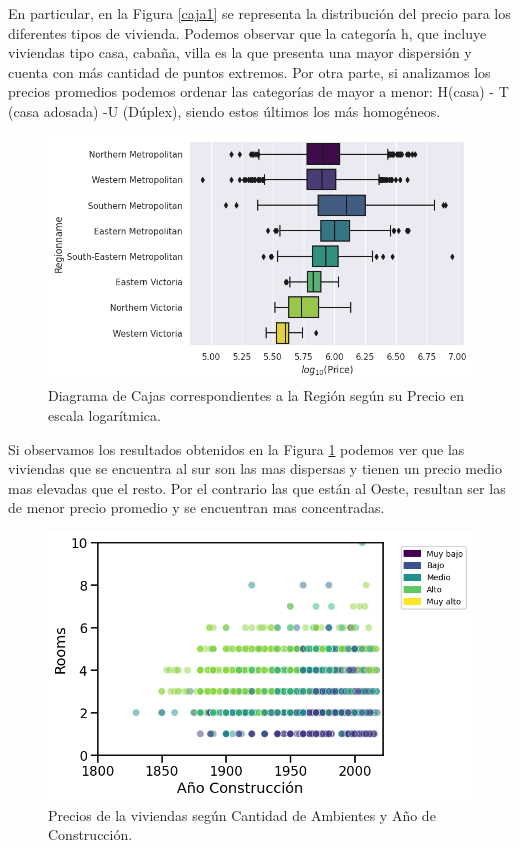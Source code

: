 En particular, en la Figura \ref{caja1} se representa la distribución del precio para los diferentes tipos de vivienda. Podemos observar que la categoría h, que incluye viviendas tipo casa, cabaña, villa es la que presenta una mayor dispersión y cuenta con más cantidad de puntos extremos. Por otra parte, si analizamos los precios promedios podemos ordenar las categorías de mayor a menor: H(casa) - T (casa adosada) -U (Dúplex), siendo estos últimos los más homogéneos.

\begin{figure} [!ht]
\begin{center}
\includegraphics[width=0.8\columnwidth]{img/box2.png}
\caption{Diagrama de Cajas correspondientes a la Región según su Precio en escala logarítmica.}
\label{caja2}
\end{center}
\end{figure}


Si observamos los resultados obtenidos en la Figura \ref{caja2} podemos ver que las viviendas que se encuentra al sur son las mas dispersas y tienen un precio medio mas elevadas que el resto. Por el contrario las que están al Oeste, resultan ser las de menor precio promedio y se encuentran mas concentradas.

\begin{figure} [!ht]
\begin{center}
\includegraphics[width=0.8\columnwidth]{img/Scatt1.png}
\caption{Precios de la viviendas según Cantidad de Ambientes y Año de Construcción.}
\label{amb-anio}
\end{center}
\end{figure}

